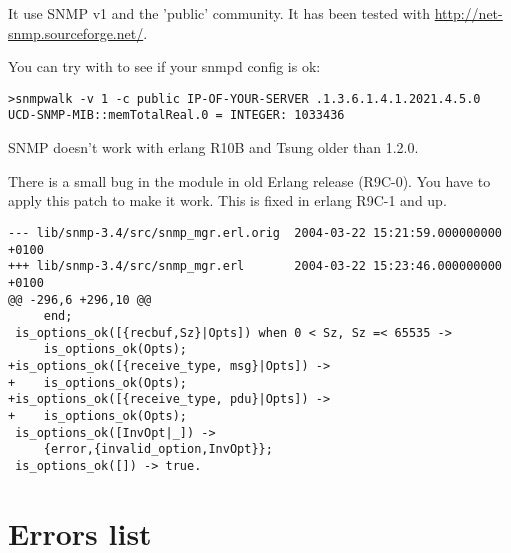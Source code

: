 \documentclass{IDXDOC-en}
\begin{document}
\begin{appendix}
It use SNMP v1 and the 'public' community. It has been tested with
\url{http://net-snmp.sourceforge.net/}.

You can try with  to see if your snmpd config is ok:

\begin{Verbatim}
>snmpwalk -v 1 -c public IP-OF-YOUR-SERVER .1.3.6.1.4.1.2021.4.5.0
UCD-SNMP-MIB::memTotalReal.0 = INTEGER: 1033436
\end{Verbatim}

SNMP doesn't work with erlang R10B and Tsung older than 1.2.0.

There is a small bug in the  module in old Erlang
release (R9C-0). You have to apply this patch to make it
work. This is fixed in erlang R9C-1 and up.


\begin{Verbatim}
--- lib/snmp-3.4/src/snmp_mgr.erl.orig  2004-03-22 15:21:59.000000000 +0100
+++ lib/snmp-3.4/src/snmp_mgr.erl       2004-03-22 15:23:46.000000000 +0100
@@ -296,6 +296,10 @@
     end;
 is_options_ok([{recbuf,Sz}|Opts]) when 0 < Sz, Sz =< 65535 ->
     is_options_ok(Opts);
+is_options_ok([{receive_type, msg}|Opts]) ->
+    is_options_ok(Opts);
+is_options_ok([{receive_type, pdu}|Opts]) ->
+    is_options_ok(Opts);
 is_options_ok([InvOpt|_]) ->
     {error,{invalid_option,InvOpt}};
 is_options_ok([]) -> true.
\end{Verbatim}

\section{Errors list}


\end{appendix}
\end{document}
